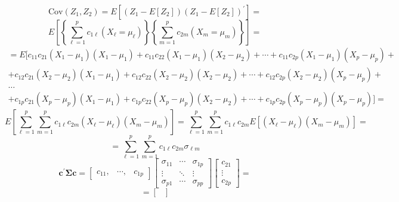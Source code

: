 \begin{enumerate}[font=\bfseries]
        \[
            \text{Cov}\left(Z_1, Z_2\right)
            =
            E\left[\left(Z_1 - E[Z_2]\right){\left(Z_1 - E[Z_2]\right)}^\prime\right]
            =
        \]
        \[
            E\left[\left\{\sum_{\ell=1}^{p}c_{1\ell}\left(X_\ell=\mu_\ell\right)\right\}\left\{\sum_{m=1}^{p}c_{2m}\left(X_m=\mu_m\right)\right\}\right]
            =
        \]
        \begin{multline*}
            =
            E[c_{11}c_{21}(X_1 - \mu_1)(X_1 - \mu_1) + c_{11}c_{22}(X_1 - \mu_1)(X_2 - \mu_2) +
            \cdots + c_{11}c_{2p}(X_1 - \mu_1)(X_p - \mu_p) + \\
            +c_{12}c_{21}(X_2 - \mu_2)(X_1 - \mu_1) + c_{12}c_{22}(X_2 - \mu_2)(X_2 - \mu_2) +
            \cdots + c_{12}c_{2p}(X_2 - \mu_2)(X_p - \mu_p) + \\
            \dots \\
            +c_{1p}c_{21}(X_p - \mu_p)(X_1 - \mu_1) + c_{1p}c_{22}(X_p - \mu_p)(X_2 - \mu_2) +
            \cdots + c_{1p}c_{2p}(X_p - \mu_p)(X_p - \mu_p)
            ] =
        \end{multline*}
        \[
            E\left[\sum_{\ell=1}^{p}{\sum_{m=1}^{p}{c_{1\ell}c_{2m}\left(X_{\ell} - \mu_{\ell}\right)\left(X_{m} - \mu_{m}\right)}}\right]
            =
            \sum_{\ell=1}^{p}{\sum_{m=1}^{p}{c_{1\ell}c_{2m}E\left[\left(X_{\ell} - \mu_{\ell}\right)\left(X_{m} - \mu_{m}\right)\right]}}
            =
        \]
        \[
            =
            \sum_{\ell=1}^{p}{\sum_{m=1}^{p}{c_{1\ell}c_{2m}\sigma_{\ell m}}}
        \]
        \[
            \mathbf{c}^\prime\mathbf{\Sigma}\mathbf{c}
            =
            \begin{bmatrix}
                c_{11}, & \cdots, & c_{1p}
            \end{bmatrix}
            \begin{bmatrix}
                \sigma_{11} & \cdots & \sigma_{1p} \\
                \vdots & \ddots & \vdots \\
                \sigma_{p1} & \cdots & \sigma_{pp}
            \end{bmatrix}
            \begin{bmatrix}
                c_{21} \\
                \vdots \\
                c_{2p}
            \end{bmatrix}
            =
        \]
        \[
            =
            \begin{bmatrix}

\end{bmatrix}\]
\end{enumerate}

